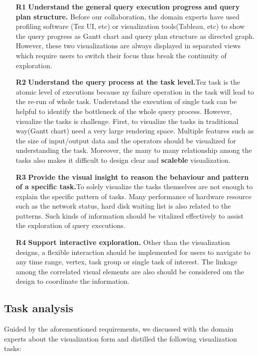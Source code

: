 \begin{itemize}
  \item[\textbf{R1}]\textbf{Understand the general query execution progress and query plan structure.} Before our collaboration, the domain experts have used profiling software (Tez  UI, etc) or visualization tools(Tableau, etc) to show the query progress as Gantt chart and query plan structure as directed graph. However, these two visualizations are always displayed in separated views which require users to switch their focus thus break the continuity of exploration.
  \item[\textbf{R2}]\textbf{Understand the query process at the task level.}Tez task is the atomic level of executions because ny failure operation in the task will lead to the re-run of whole task. Understand the execution of single task can be helpful to identify the bottleneck of the whole query process. However, visualize the tasks is challenge. First, to visualize the tasks in traditional way(Gantt chart) need a very large rendering space. Multiple features such as the size of input/output data and the operators should be visualized for understanding the task. Moreover, the many to many relationship among the tasks also makes it difficult to design clear and \textbf{scaleble} visualization.
  \item[\textbf{R3}]\textbf{Provide the visual insight to reason the behaviour and pattern of a specific task.}To solely visualize the tasks themselves are not enough to explain the specific pattern of tasks. Many performance of hardware resource such as the network status, hard disk waiting list is also related to the patterns. Such kinds of information should be vitalized effectively to assist the exploration of query executions. 
  \item[\textbf{R4}]\textbf{ Support interactive exploration.} Other than the visualization designs, a flexible interaction should be implemented for users to navigate to any time range, vertex, task group or single task of interest. The linkage among the correlated visual elements are also should be considered om the design to coordinate the information.

\end{itemize}

\subsection{Task analysis}
Guided by the aforementioned requirements, we discussed with the domain experts about the visualization form and distilled the following visualization tasks:

